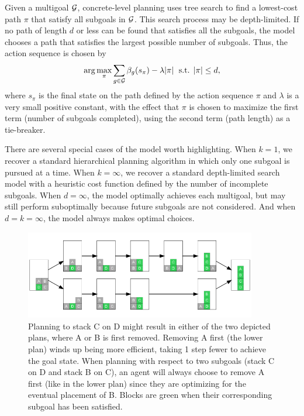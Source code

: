 \documentclass[10pt,letterpaper]{article}
\begin{document}
Given a multigoal $\mathcal{G}$, concrete-level planning uses tree search to find a lowest-cost path $\pi$ that satisfy all subgoals in $\mathcal{G}$. This search process may be depth-limited. If no path of length $d$ or less can be found that satisfies all the subgoals, the model chooses a path that satisfies the largest possible number of subgoals. Thus, the action sequence is chosen by
%
\begin{equation}\label{eq:concrete}
  \arg\max_\pi 
    \sum_{g \in \mathcal{G}} \beta_g(s_\pi) - \lambda |\pi |
    \; \text{ s.t.  } |\pi| \leq d,
\end{equation}
%
where $s_\pi$ is the final state on the path defined by the action sequence $\pi$ and $\lambda$ is a very small positive constant, with the effect that $\pi$ is chosen to maximize the first term (number of subgoals completed), using the second term (path length) as a tie-breaker.

There are several special cases of the model worth highlighting. When $k = 1$, we recover a standard hierarchical planning algorithm in which only one subgoal is pursued at a time. When $k = \infty$, we recover a standard depth-limited search model with a heuristic cost function defined by the number of incomplete subgoals. When $d = \infty$, the model optimally achieves each multigoal, but may still perform suboptimally because future subgoals are not considered. And when $d = k = \infty$, the model always makes optimal choices.


\begin{figure}[ht]
    \centering
    \includegraphics[width=0.9\textwidth]{example-4-block.png}
    \caption{Planning to stack C on D might result in either of the two depicted plans, where A or B is first removed. Removing A first (the lower plan) winds up being more efficient, taking 1 step fewer to achieve the goal state. When planning with respect to two subgoals (stack C on D and stack B on C), an agent will always choose to remove A first (like in the lower plan) since they are optimizing for the eventual placement of B. Blocks are green when their corresponding subgoal has been satisfied.}
    \label{fig:fourblock}
\end{figure}
\end{document}

